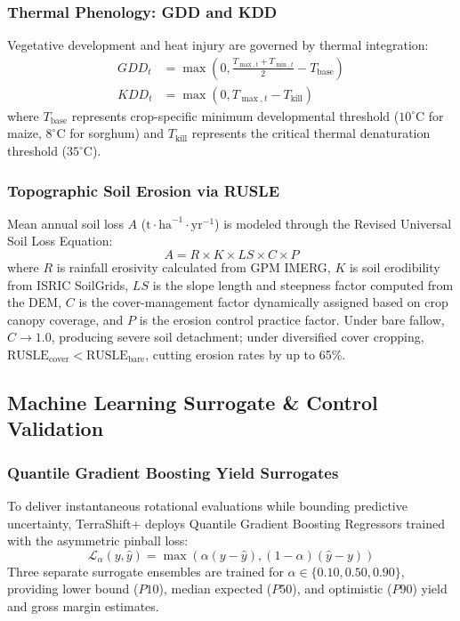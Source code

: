 \documentclass[10pt,twocolumn]{article}
\begin{document}
\subsubsection{Thermal Phenology: GDD and KDD}
Vegetative development and heat injury are governed by thermal integration:
\begin{align}
GDD_t &= \max\left(0, \frac{T_{\max,t} + T_{\min,t}}{2} - T_{\text{base}}\right) \\
KDD_t &= \max\left(0, T_{\max,t} - T_{\text{kill}}\right)
\end{align}
where $T_{\text{base}}$ represents crop-specific minimum developmental threshold ($10^\circ\text{C}$ for maize, $8^\circ\text{C}$ for sorghum) and $T_{\text{kill}}$ represents the critical thermal denaturation threshold ($35^\circ\text{C}$).

\subsubsection{Topographic Soil Erosion via RUSLE}
Mean annual soil loss $A$ ($\text{t}\cdot\text{ha}^{-1}\cdot\text{yr}^{-1}$) is modeled through the Revised Universal Soil Loss Equation:
\begin{equation}
A = R \times K \times LS \times C \times P
\end{equation}
where $R$ is rainfall erosivity calculated from GPM IMERG, $K$ is soil erodibility from ISRIC SoilGrids, $LS$ is the slope length and steepness factor computed from the DEM, $C$ is the cover-management factor dynamically assigned based on crop canopy coverage, and $P$ is the erosion control practice factor. Under bare fallow, $C \to 1.0$, producing severe soil detachment; under diversified cover cropping, $\mathrm{RUSLE}_{\mathrm{cover}} < \mathrm{RUSLE}_{\mathrm{bare}}$, cutting erosion rates by up to 65\%.

\subsection{Machine Learning Surrogate \& Control Validation}

\subsubsection{Quantile Gradient Boosting Yield Surrogates}
To deliver instantaneous rotational evaluations while bounding predictive uncertainty, TerraShift+ deploys Quantile Gradient Boosting Regressors trained with the asymmetric pinball loss:
\begin{equation}
\mathcal{L}_\alpha(y, \hat{y}) = \max\left(\alpha (y - \hat{y}), (1 - \alpha)(\hat{y} - y)\right)
\end{equation}
Three separate surrogate ensembles are trained for $\alpha \in \{0.10, 0.50, 0.90\}$, providing lower bound ($P10$), median expected ($P50$), and optimistic ($P90$) yield and gross margin estimates.
\end{document}
